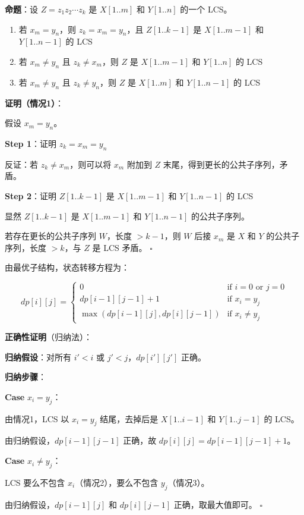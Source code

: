 \documentclass[12pt, a4paper]{ctexart}
\begin{document}
\begin{blackboard}

\textbf{命题}：设 $Z = z_1 z_2 \cdots z_k$ 是 $X[1..m]$ 和 $Y[1..n]$ 的一个 LCS。

\begin{enumerate}
    \item 若 $x_m = y_n$，则 $z_k = x_m = y_n$，且 $Z[1..k-1]$ 是 $X[1..m-1]$ 和 $Y[1..n-1]$ 的 LCS
    \item 若 $x_m \neq y_n$ 且 $z_k \neq x_m$，则 $Z$ 是 $X[1..m-1]$ 和 $Y[1..n]$ 的 LCS
    \item 若 $x_m \neq y_n$ 且 $z_k \neq y_n$，则 $Z$ 是 $X[1..m]$ 和 $Y[1..n-1]$ 的 LCS
\end{enumerate}

\textbf{证明（情况1）}：

假设 $x_m = y_n$。

\textbf{Step 1}：证明 $z_k = x_m = y_n$

反证：若 $z_k \neq x_m$，则可以将 $x_m$ 附加到 $Z$ 末尾，得到更长的公共子序列，矛盾。

\textbf{Step 2}：证明 $Z[1..k-1]$ 是 $X[1..m-1]$ 和 $Y[1..n-1]$ 的 LCS

显然 $Z[1..k-1]$ 是 $X[1..m-1]$ 和 $Y[1..n-1]$ 的公共子序列。

若存在更长的公共子序列 $W$，长度 $> k-1$，则 $W$ 后接 $x_m$ 是 $X$ 和 $Y$ 的公共子序列，长度 $> k$，与 $Z$ 是 LCS 矛盾。 $\square$

\end{blackboard}

\begin{blackboard}

由最优子结构，状态转移方程为：

\[
dp[i][j] = \begin{cases}
0 & \text{if } i = 0 \text{ or } j = 0 \\
dp[i-1][j-1] + 1 & \text{if } x_i = y_j \\
\max(dp[i-1][j], dp[i][j-1]) & \text{if } x_i \neq y_j
\end{cases}
\]

\textbf{正确性证明}（归纳法）：

\textbf{归纳假设}：对所有 $i' < i$ 或 $j' < j$，$dp[i'][j']$ 正确。

\textbf{归纳步骤}：

\textbf{Case} $x_i = y_j$：

由情况1，LCS 以 $x_i = y_j$ 结尾，去掉后是 $X[1..i-1]$ 和 $Y[1..j-1]$ 的 LCS。

由归纳假设，$dp[i-1][j-1]$ 正确，故 $dp[i][j] = dp[i-1][j-1] + 1$。

\textbf{Case} $x_i \neq y_j$：

LCS 要么不包含 $x_i$（情况2），要么不包含 $y_j$（情况3）。

由归纳假设，$dp[i-1][j]$ 和 $dp[i][j-1]$ 正确，取最大值即可。 $\square$

\end{blackboard}
\end{document}
